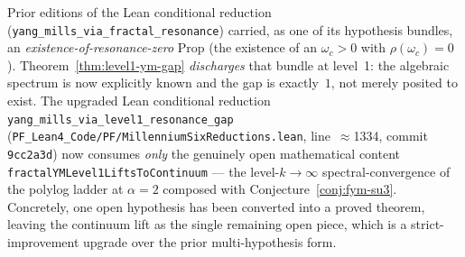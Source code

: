 \begin{remark}\label{rem:ym-level1-upgrade}
Prior editions of the Lean conditional reduction (\texttt{yang\_mills\_via\_fractal\_resonance}) carried, as one of its hypothesis bundles, an \emph{existence-of-resonance-zero} Prop (the existence of an $\omega_c > 0$ with $\rho(\omega_c) = 0$). Theorem~\ref{thm:level1-ym-gap} \emph{discharges} that bundle at level~1: the algebraic spectrum is now explicitly known and the gap is exactly~$1$, not merely posited to exist. The upgraded Lean conditional reduction \texttt{yang\_mills\_via\_level1\_resonance\_gap} (\texttt{PF\_Lean4\_Code/PF/MillenniumSixReductions.lean}, line~$\approx$1334, commit \texttt{9cc2a3d}) now consumes \emph{only} the genuinely open mathematical content \texttt{fractalYMLevel1LiftsToContinuum} — the level-$k \to \infty$ spectral-convergence of the polylog ladder at $\alpha = 2$ composed with Conjecture~\ref{conj:fym-su3}. Concretely, one open hypothesis has been converted into a proved theorem, leaving the continuum lift as the single remaining open piece, which is a strict-improvement upgrade over the prior multi-hypothesis form.
\end{remark}

